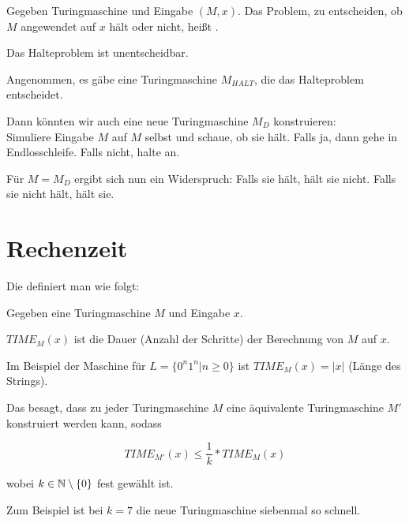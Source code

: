 \begin{definition}
    Gegeben Turingmaschine und Eingabe $(M, x)$. Das Problem, zu entscheiden, ob $M$ angewendet auf $x$ hält oder nicht, heißt .
\end{definition}

\begin{satz}
    Das Halteproblem ist unentscheidbar.
\end{satz}

\begin{beweis}
    Angenommen, es gäbe eine Turingmaschine $M_{HALT}$, die das Halteproblem entscheidet.

    Dann könnten wir auch eine neue Turingmaschine $M_D$ konstruieren:\\
    Simuliere Eingabe $M$ auf $M$ selbst und schaue, ob sie hält. Falls ja, dann gehe in Endlosschleife. Falls nicht, halte an.

    Für $M = M_D$ ergibt sich nun ein Widerspruch: Falls sie hält, hält sie nicht. Falls sie nicht hält, hält sie.
\end{beweis}




\section{Rechenzeit}


\begin{definition}
    Die  definiert man wie folgt:

    Gegeben eine Turingmaschine $M$ und Eingabe $x$. 

    $TIME_M(x)$ ist die Dauer (Anzahl der Schritte) der Berechnung von $M$ auf $x$.
\end{definition}

Im Beispiel der Maschine für $L = \{ 0^n 1^n | n \geq 0 \}$ ist $TIME_M(x) = |x| $ (Länge des Strings).




\begin{satz}
    Das  besagt, dass zu jeder Turingmaschine $M$ eine äquivalente Turingmaschine $M'$ konstruiert werden kann, sodass

    $$ TIME_{M'}(x) \leq \frac{1}{k} * TIME_M(x) $$

    wobei $k \in \mathbb{N} \setminus \{0\}$ fest gewählt ist.
\end{satz}

Zum Beispiel ist bei $k = 7$ die neue Turingmaschine siebenmal so schnell.

